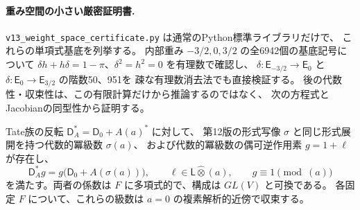 \paragraph{重み空間の小さい厳密証明書.}
\texttt{v13\_weight\_space\_certificate.py} は通常のPython標準ライブラリだけで、
これらの単項式基底を列挙する。
内部重み $-3/2,0,3/2$ の全6942個の基底記号について
$\delta h+h\delta=1-\pi$、$\delta^2=h^2=0$ を有理数で確認し、
$\delta:\mathsf E_{-3/2}\to\mathsf E_0$ と
$\delta:\mathsf E_0\to\mathsf E_{3/2}$ の階数50、951を
疎な有理数消去法でも直接検証する。
後の代数性・収束性は、この有限計算だけから推論するのではなく、
次の方程式とJacobianの同型性から証明する。

\begin{proposition}[反転したTate族の代数的な切断への帰着]
\label{prop:v13-algebraic-marked-regauging}
Tate族の反転 $\mathsf D_A^*=\mathsf D_0+A(a)^*$ に対して、
第12版の形式写像 $\sigma$ と同じ形式展開を持つ代数的冪級数 $\sigma(a)$、
および代数的冪級数の偶可逆作用素 $g=1+\ell$ が存在し、
\begin{equation}\label{eq:v13-algebraic-intertwining}
 \mathsf D_A^*g=g\bigl(\mathsf D_0+A(\sigma(a))\bigr),
 \qquad \ell\in\mathsf L\widehat\otimes(a),
 \qquad g\equiv1\pmod{(a)}
\end{equation}
を満たす。両者の係数は $F$ に多項式的で、構成は $GL(V)$ と可換である。
各固定 $F$ について、これらの級数は $a=0$ の複素解析的近傍で収束する。
\end{proposition}
